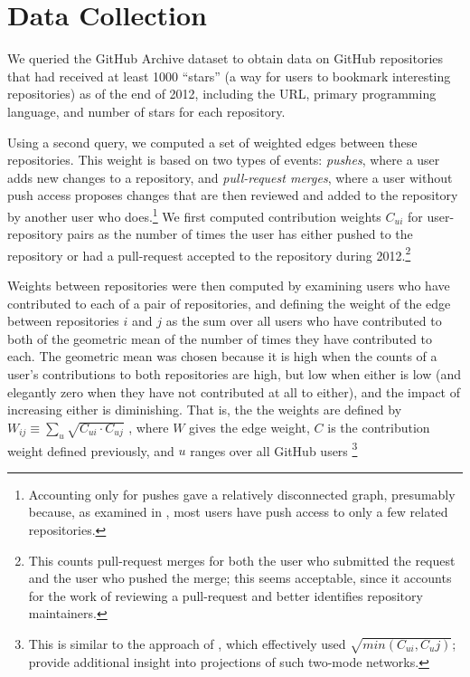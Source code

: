 \documentclass[11pt]{article}
\begin{document}
\section{Data Collection}
We queried the GitHub Archive dataset\cite{githubarchive} to obtain data on
GitHub repositories that had received at least 1000 ``stars'' (a way for users
to bookmark interesting repositories) as of the end of 2012, including the URL,
primary programming language, and number of stars for each repository.

Using a second query, we computed a set of weighted edges between these
repositories. This weight is based on two types of events: \emph{pushes}, where
a user adds new changes to a repository, and \emph{pull-request merges}, where a
user without push access proposes changes that are then reviewed and added to
the repository by another user who does.\footnote{Accounting only for pushes gave a relatively disconnected graph,
presumably because, as examined in \cite{khadke}, most users have push access to only a few related
repositories.} We first computed contribution weights $C_{ui}$ for
user-repository pairs as the number of times the user has either pushed to the
repository or had a pull-request accepted to the repository during
2012.\footnote{This counts pull-request merges for both the user who submitted
the request and the user who pushed the merge; this seems acceptable, since it
accounts for the work of reviewing a pull-request and better identifies
repository maintainers.}

Weights between repositories were then computed by examining users who have
contributed to each of a pair of repositories, and defining the weight of the
edge between repositories $i$ and $j$ as the sum over all users who have
contributed to both of the geometric mean of the number of times they have
contributed to each. The geometric mean was chosen because it is high when the
counts of a user's contributions to both repositories are high, but low when
either is low (and elegantly zero when they have not contributed at all to
either), and the impact of increasing either is diminishing. That is, the the
weights are defined by $W_{ij} \equiv \sum_u \sqrt{C_{ui} \cdot C_{uj}}$ , where
$W$ gives the edge weight, $C$ is the contribution weight defined previously,
and $u$ ranges over all GitHub users \footnote{This is similar to the approach
of \cite{marrama}, which effectively used $\sqrt{min(C_{ui}, C_uj)}$;
\cite{opsahlproj,opsahl11} provide additional insight into projections of
such two-mode networks.}
\end{document}
